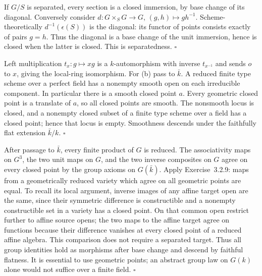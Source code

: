 \documentclass[11pt]{article}
\let\chapterexercise\exercise
\renewcommand{\exercise}[2]{\Needspace{8\baselineskip}\chapterexercise{#1}{#2}}
\begin{document}
\pf
If $G/S$ is separated, every section is a closed immersion, by base change of its diagonal. Conversely consider $d:G\times_SG\to G$, $(g,h)\mapsto gh^{-1}$. Scheme-theoretically $d^{-1}(\epsilon(S))$ is the diagonal: its functor of points consists exactly of pairs $g=h$. Thus the diagonal is a base change of the unit immersion, hence is closed when the latter is closed. This is separatedness. \hfill$\square$

\pf
Left multiplication $t_x:g\mapsto xg$ is a $k$-automorphism with inverse $t_{x^{-1}}$ and sends $o$ to $x$, giving the local-ring isomorphism. For (b) pass to $\bar k$. A reduced finite type scheme over a perfect field has a nonempty smooth open on each irreducible component. In particular there is a smooth closed point $a$. Every geometric closed point is a translate of $a$, so all closed points are smooth. The nonsmooth locus is closed, and a nonempty closed subset of a finite type scheme over a field has a closed point; hence that locus is empty. Smoothness descends under the faithfully flat extension $\bar k/k$. \hfill$\square$

\pf
After passage to $\bar k$, every finite product of $G$ is reduced. The associativity maps on $G^3$, the two unit maps on $G$, and the two inverse composites on $G$ agree on every closed point by the group axioms on $G(\bar k)$. Apply Exercise~3.2.9: maps from a geometrically reduced variety which agree on all geometric points are equal. To recall its local argument, inverse images of any affine target open are the same, since their symmetric difference is constructible and a nonempty constructible set in a variety has a closed point. On that common open restrict further to affine source opens; the two maps to the affine target agree on functions because their difference vanishes at every closed point of a reduced affine algebra. This comparison does not require a separated target. Thus all group identities hold as morphisms after base change and descend by faithful flatness. It is essential to use geometric points; an abstract group law on $G(k)$ alone would not suffice over a finite field. \hfill$\square$
\end{document}
